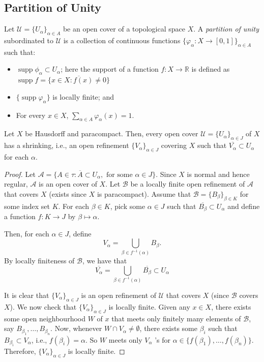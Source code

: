 \subsection*{Partition of Unity}
\begin{definition}
    Let $\mathcal{U}=\{U_\alpha\}_{\alpha \in A}$ be an open cover of a topological space \(X\).
    A \emph{partition of unity} subordinated to $\mathcal{U}$ is a collection of continuous functions \(\{\varphi_\alpha: X \to [0,1]\}_{\alpha \in A}\) such that:
    \begin{itemize}
        \item $\operatorname{supp} \phi_\alpha\subset U_\alpha$; here the support of a function \(f:X\to \mathbb{R}\) is defined as \(\operatorname{supp} f = \overline{\{x \in X : f(x) \neq 0\}}\)
        \item $\{\operatorname{supp}\varphi_\alpha\}$ is locally finite; and
        \item For every \(x \in X\), \(\sum_{\alpha\in A} \varphi_\alpha(x) = 1\).
    \end{itemize}
\end{definition}

\begin{lemma}
    Let $X$ be Hausdorff and paracompact. Then, every open cover $\mathcal{U}=\{U_\alpha\}_{\alpha \in J}$ of $X$ has a shrinking, i.e., an open refinement $\{V_\alpha\}_{\alpha \in J}$ covering $X$ such that $\overline{V_\alpha}\subset U_\alpha$ for each $\alpha$.
\end{lemma}
\begin{proof}
    Let $\mathcal{A}=\{A\in \tau:\overline{A}\subset U_\alpha, \text{ for some }\alpha \in J\}$. Since $X$ is normal and hence regular, $\mathcal{A}$ is an open cover of $X$. Let $\mathcal{B}$ be a locally finite open refinement of $\mathcal{A}$ that covers $X$ (exists since $X$ is paracompact). Assume that $\mathcal{B}=\{B_\beta\}_{\beta\in K}$ for some index set $K$. For each $\beta\in K$, pick some $\alpha\in J$ such that $\overline{B_\beta}\subset U_\alpha$ and define a function $f:K\to J$ by $\beta\mapsto \alpha$. 

    Then, for each $\alpha\in J$, define
    \[V_\alpha=\bigcup_{\beta\in f^{-1}(\alpha)} B_\beta.\]
    By locally finiteness of $\mathcal{B}$, we have that 
    $$\overline{V_\alpha}=\bigcup_{\beta\in f^{-1}(\alpha)} \overline{B_\beta}\subset U_\alpha$$ 

    It is clear that $\{V_\alpha\}_{\alpha \in J}$ is an open refinement of $\mathcal{U}$ that covers $X$ (since $\mathcal{B}$ covers $X$). We now check that $\{V_\alpha\}_{\alpha \in J}$ is locally finite. Given any $x\in X$, there exists some open neighbourhood $W$ of $x$ that meets only finitely many elements of $\mathcal{B}$, say $B_{\beta_1},\ldots, B_{\beta_n}$. Now, whenever $W\cap V_\alpha\neq \emptyset$, there exists some $\beta_i$ such that $B_{\beta_i}\subset V_\alpha$, i.e., $f(\beta_i)=\alpha$. So $W$ meets only $V_\alpha$ 's for $\alpha\in \{f(\beta_1),\ldots,f(\beta_n)\}$. Therefore, $\{V_\alpha\}_{\alpha \in J}$ is locally finite.
\end{proof}

